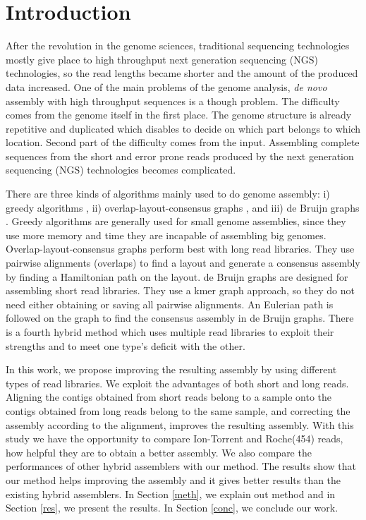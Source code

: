 \documentclass[12pt]{article}
\begin{document}
\section{Introduction}

After the revolution in the genome sciences, traditional sequencing technologies mostly give place to high throughput next generation sequencing (NGS) technologies, so the read lengths became shorter and the amount of the produced data increased. One of the main problems of the genome analysis, \textit{de novo} assembly with high throughput sequences is a though problem. The difficulty comes from the genome itself in the first place. The genome structure is already repetitive and duplicated which disables to decide on which part belongs to which location. Second part of the difficulty comes from the input. Assembling complete sequences from the short and error prone reads produced by the next generation sequencing (NGS) technologies becomes complicated.

There are three kinds of algorithms mainly used to do genome assembly: i) greedy algorithms \cite{ssake:2007,sharcgs:2007,vcake:2007}, ii) overlap-layout-consensus graphs \cite{celera:2000, sga:2012, hapsemblerDonmez:2011}, and iii) de Bruijn graphs \cite{eulerPevzner:2008, zerbino:2009, abyssSimpson:2009, allpaths:2008, soapdenovo:2009}. Greedy algorithms are generally used for small genome assemblies, since they use more memory and time they are incapable of assembling big genomes. Overlap-layout-consensus graphs perform best with long read libraries. They use pairwise alignments (overlaps) to find a layout and generate a consensus assembly by finding a Hamiltonian path on the layout. de Bruijn graphs are designed for assembling short read libraries. They use a kmer graph approach, so they do not need either obtaining or saving all pairwise alignments. An Eulerian path is followed on the graph to find the consensus assembly in de Bruijn graphs. There is a fourth hybrid method which uses multiple read libraries to exploit their strengths and to meet one type's deficit with the other.

In this work, we propose improving the resulting assembly by using different types of read libraries. We exploit the advantages of both short and long reads. Aligning the contigs obtained from short reads belong to a sample onto the contigs obtained from long reads belong to the same sample, and correcting the assembly according to the alignment, improves the resulting assembly. With this study we have the opportunity to compare Ion-Torrent and Roche(454) reads, how helpful they are to obtain a better assembly. We also compare the performances of other hybrid assemblers with our method. The results show that our method helps improving the assembly and it gives better results than the existing hybrid assemblers. In Section \ref{meth}, we explain out method and in Section \ref{res}, we present the results. In Section \ref{conc}, we conclude our work.
\end{document}
